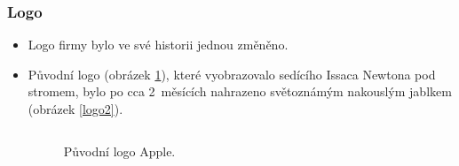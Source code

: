 \documentclass{beamer}
\begin{document}
\begin{frame}
\frametitle{Logo}
\begin{itemize}
 \item Logo firmy bylo ve své historii jednou změněno.
 \item Původní logo (obrázek \ref{logo1}), které vyobrazovalo sedícího Issaca Newtona pod stromem, bylo po cca 2~měsících nahrazeno světoznámým nakouslým jablkem (obrázek \ref{logo2}). \\
\begin{columns}
\begin{figure}[h]
	\begin{center}
 	\caption{Původní logo Apple.}
	\label{logo1}
	\end{center}
\end{figure}


\end{columns}
\end{itemize}
\end{frame}
\end{document}
